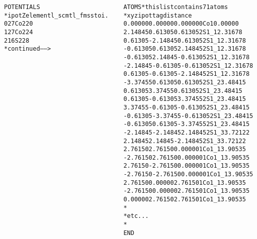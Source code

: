 \begin{frame}[fragile]
\begin{columns}[T]
\begin{column}{0.44\linewidth}
\begin{onlyenv}
\begin{block}{}
\begin{alltt}
 {\color{Brown4}POTENTIALS}
 {\color{Blue4}*   ipot  Z  element  l\_scmt  l\_fms  stoi.}
        0   27   Co       2       2       0
        1   27   Co       2       2       4
        2   16   S        2       2       8
                          {\color{Blue4}* continued ------>}
          \end{alltt}
        \end{block}
      \end{onlyenv}
     \end{column}
     \begin{column}{0.54\linewidth}
      \begin{block}{}
         \begin{alltt}
         \tiny
  {\color{Brown4}ATOMS}   {\color{Blue4}* this list contains 71 atoms
  *   x          y          z     ipot  tag     distance}
     0.00000    0.00000    0.00000  0  Co1     0.00000
     2.14845    0.61305    0.61305  2  S1\_1    2.31678
     0.61305   -2.14845    0.61305  2  S1\_1    2.31678
    -0.61305    0.61305    2.14845  2  S1\_1    2.31678
    -0.61305    2.14845   -0.61305  2  S1\_1    2.31678
    -2.14845   -0.61305   -0.61305  2  S1\_1    2.31678
     0.61305   -0.61305   -2.14845  2  S1\_1    2.31678
    -3.37455    0.61305    0.61305  2  S1\_2    3.48415
     0.61305    3.37455    0.61305  2  S1\_2    3.48415
     0.61305   -0.61305    3.37455  2  S1\_2    3.48415
     3.37455   -0.61305   -0.61305  2  S1\_2    3.48415
    -0.61305   -3.37455   -0.61305  2  S1\_2    3.48415
    -0.61305    0.61305   -3.37455  2  S1\_2    3.48415
    -2.14845   -2.14845    2.14845  2  S1\_3    3.72122
     2.14845    2.14845   -2.14845  2  S1\_3    3.72122
     2.76150    2.76150    0.00000  1  Co1\_1   3.90535
    -2.76150    2.76150    0.00000  1  Co1\_1   3.90535
     2.76150   -2.76150    0.00000  1  Co1\_1   3.90535
    -2.76150   -2.76150    0.00000  1  Co1\_1   3.90535
     2.76150    0.00000    2.76150  1  Co1\_1   3.90535
    -2.76150    0.00000    2.76150  1  Co1\_1   3.90535
     0.00000    2.76150    2.76150  1  Co1\_1   3.90535
  {\color{Blue4}*
  * etc...
  *}
  {\color{Purple2}END}
         \end{alltt}
       \end{block}
     \end{column}
   \end{columns}
\end{frame}


